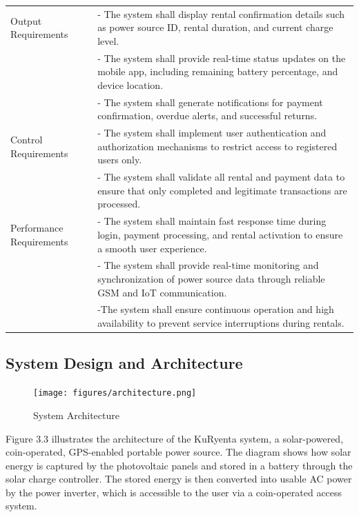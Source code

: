 {\begin{longtable}{p{4cm} p{9cm}}
	Output Requirements & - The system shall display rental confirmation details such as power source ID, rental duration, and current charge level. \\
	& - The system shall provide real-time status updates on the mobile app, including remaining battery percentage, and device location. \\
	& - The system shall generate notifications for payment confirmation, overdue alerts, and successful returns. \\
	\midrule
	
	Control Requirements & - The system shall implement user authentication and authorization mechanisms to restrict access to registered users only. \\
	& - The system shall validate all rental and payment data to ensure that only completed and legitimate transactions are processed. \\
	\midrule
	
	Performance Requirements & - The system shall maintain fast response time during login, payment processing, and rental activation to ensure a smooth user experience. \\
	& - The system shall provide real-time monitoring and synchronization of power source data through reliable GSM and IoT communication.\\
	& -The system shall ensure continuous operation and high availability to prevent service interruptions during rentals. \\
\end{longtable} 

\subsection{System Design and Architecture}

\begin{figure}[H]
	\centering
	\caption{System Architecture}
	\label{fig:architecture}
	\texttt{[image: figures/architecture.png]}
\end{figure}

Figure 3.3 illustrates the architecture of the KuRyenta system, a solar-powered, coin-operated, GPS-enabled portable power source. The diagram shows how solar energy is captured by the photovoltaic panels and stored in a  battery through the solar charge controller. The stored energy is then converted into usable AC power by the power inverter, which is accessible to the user via a coin-operated access system.

}
